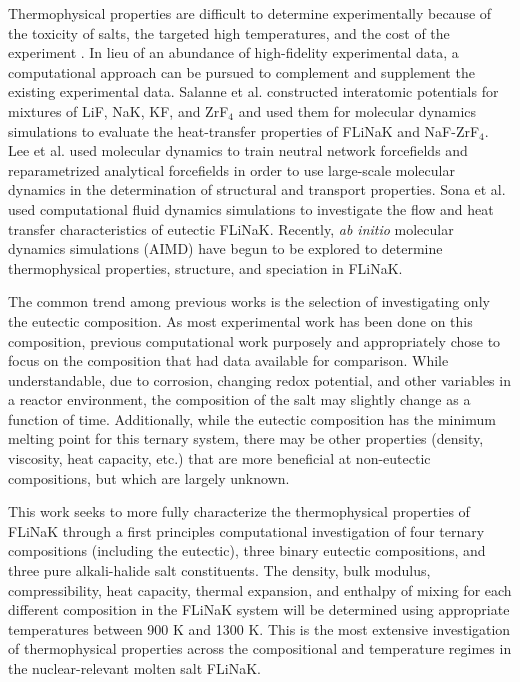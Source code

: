 \documentclass[preprint,12pt]{elsarticle}
\begin{document}
Thermophysical properties are difficult to determine experimentally because of the toxicity of salts, the targeted high temperatures, and the cost of the experiment \cite{Porter2022}. In lieu of an abundance of high-fidelity experimental data, a computational approach can be pursued to complement and supplement the existing experimental data. Salanne et al. constructed interatomic potentials for mixtures of LiF, NaK, KF, and ZrF$_4$ and used them for molecular dynamics simulations to evaluate the heat-transfer properties of FLiNaK and NaF-ZrF$_4$\cite{Salanne2009}. Lee et al. used molecular dynamics to train neutral network forcefields and reparametrized analytical forcefields in order to use large-scale molecular dynamics in the determination of structural and transport properties\cite{Lee2021}. Sona et al. used computational fluid dynamics simulations to investigate the flow and heat transfer characteristics of eutectic FLiNaK\cite{Sona2014}. Recently, \textit{ab initio} molecular dynamics simulations (AIMD) have begun to be explored to determine thermophysical properties, structure, and speciation in FLiNaK\cite{Nam2014,Frandsen2020,Clark2020,Sprouster2022}. 

The common trend among previous works is the selection of investigating only the eutectic composition. As most experimental work has been done on this composition, previous computational work purposely and appropriately chose to focus on the composition that had data available for comparison. While understandable, due to corrosion, changing redox potential, and other variables in a reactor environment, the composition of the salt may slightly change as a function of time. Additionally, while the eutectic composition has the minimum melting point for this ternary system, there may be other properties (density, viscosity, heat capacity, etc.) that are more beneficial at non-eutectic compositions, but which are largely unknown\cite{Benes2009}.

This work seeks to more fully characterize the thermophysical properties of FLiNaK through a first principles computational investigation of four ternary compositions (including the eutectic), three binary eutectic compositions, and three pure alkali-halide salt constituents. The density, bulk modulus, compressibility, heat capacity, thermal expansion, and enthalpy of mixing for each different composition in the FLiNaK system will be determined using appropriate temperatures between 900 K and 1300 K. This is the most extensive investigation of thermophysical properties across the compositional and temperature regimes in the nuclear-relevant molten salt FLiNaK.
\end{document}
